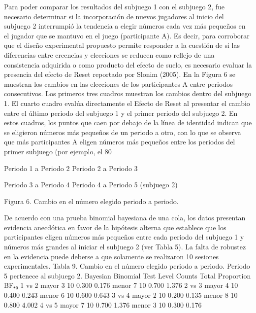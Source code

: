 Para poder comparar los resultados del subjuego 1 con el subjuego 2, fue necesario determinar si la incorporación de nuevos jugadores al inicio del subjuego 2 interrumpió la tendencia a elegir números cada vez más pequeños en el jugador que se mantuvo en el juego (participante A). Es decir, para corroborar que el diseño experimental propuesto permite responder a la cuestión de si las diferencias entre creencias y elecciones se reducen como reflejo de una consistencia adquirida o como producto del efecto de suelo, es necesario evaluar la presencia del efecto de Reset reportado por Slonim (2005).
En la Figura 6 se muestran los cambios en las elecciones de los participantes A entre periodos consecutivos. Los primeros tres cuadros muestran los cambios dentro del subjuego 1.  El cuarto cuadro  evalúa directamente el Efecto de Reset al presentar el cambio entre el último periodo del subjuego 1 y el primer periodo del subjuego 2. En estos cuadros, los puntos que caen por debajo de la línea de identidad indican que se eligieron números más pequeños de un periodo a otro, con lo que se observa que más participantes A eligen números más pequeños entre los periodos del primer subjuego (por ejemplo, el 80%

  
Periodo 1 a Periodo 2				Periodo 2 a Periodo 3
  
Periodo 3 a Periodo 4			Periodo 4 a Periodo 5 (subjuego 2)

Figura 6. Cambio en el número elegido periodo a periodo.

De acuerdo con una prueba binomial bayesiana de una cola, los datos presentan evidencia anecdótica en favor de la hipótesis alterna que establece que los participantes eligen números más pequeños entre cada periodo del subjuego 1 y números más grandes al iniciar el subjuego 2 (ver Tabla 5). La falta de robustez en la evidencia puede deberse a que solamente se realizaron 10 sesiones experimentales.
Tabla 9. Cambio en el número elegido periodo a periodo. Periodo 5 pertenece al subjuego 2.
Bayesian Binomial Test
  	Level 	Counts 	Total 	Proportion 	BF₊₀ 
1 vs 2 		mayor 		3 		10 		0.300 		0.176 	
  		menor 		7 		10 		0.700 		1.376 	
2 vs 3 		mayor 		4 		10 		0.400 		0.243 	
  		menor 		6 		10 		0.600 		0.643 	
3 vs 4 		mayor 		2 		10 		0.200 		0.135 	
  		menor 		8 		10 		0.800 		4.002 	
4 vs 5 		mayor 		7 		10 		0.700 		1.376 	
  		menor 		3 		10 		0.300 		0.176 	

